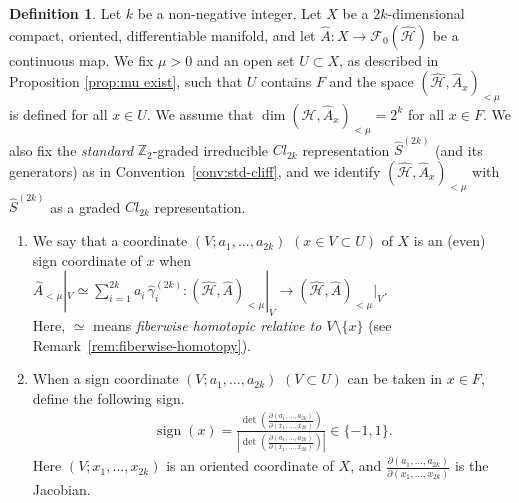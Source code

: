 \documentclass{amsart}
\theoremstyle{definition}
\newtheorem{dfn}[thm]{Definition}
\theoremstyle{remark}
\begin{document}
\begin{dfn}\label{dfn:even sign coordinates}
Let $k$ be a non-negative integer. Let $X$ be a $2k$-dimensional compact, oriented, differentiable manifold, and let $\hat{A} \colon X \to \mathcal{F}_0(\mathcal{\hat{H}})$ be a continuous map. We fix $\mu > 0$ and an open set $U \subset X$, as described in Proposition \ref{prop:mu exist}, such that $U$ contains $F$ and the space $(\mathcal{\hat{H}}, \hat{A}_x)_{<\mu}$ is defined for all $x \in U$. We assume that $\dim(\mathcal{\hat{H}}, \hat{A}_x)_{<\mu} = 2^k$ for all $x \in F$. We also fix the \emph{standard} $\mathbb{Z}_2$-graded irreducible $Cl_{2k}$ representation $\hat S^{(2k)}$ (and its generators) as in Convention~\ref{conv:std-cliff}, and we identify $(\mathcal{\hat{H}}, \hat{A}_x)_{<\mu}$ with $\hat S^{(2k)}$ as a graded $Cl_{2k}$ representation.
\begin{enumerate}
\item We say that a coordinate $(V;a_1,...,a_{2k})$ $(x\in V \subset U)$ of $X$ is an (even) sign coordinate of $x$ when $\hat{A}_{<\mu}|_V \simeq \sum_{i=1}^{2k} a_i\,\hat{\gamma}^{(2k)}_i:(\mathcal{\hat{H}}, \hat{A})_{<\mu}|_V\to (\mathcal{\hat{H}}, \hat{A})_{<\mu}|_V.$\\
Here, $\simeq$ means \emph{fiberwise homotopic relative to $V\setminus\{x\}$} (see Remark~\ref{rem:fiberwise-homotopy}).
\item When a sign coordinate $(V;a_{1},...,a_{2k})$ $(V\subset U)$ can be taken in $x \in F$, define the following sign.
\begin{align*}
\operatorname{sign}(x)=
\frac{\det\left(\frac{\partial(a_{1},\dots,a_{2k})}{\partial (x_{1},\dots,x_{2k})}\right)}
{\left|\det\left(\frac{\partial(a_{1},\dots,a_{2k})}{\partial (x_{1},\dots,x_{2k})}\right)\right|}
\in \{-1,1\}.
\end{align*}
Here $(V;x_{1},...,x_{2k})$ is an oriented coordinate of $X$, and $\frac{\partial(a_{1},...,a_{2k})}{\partial (x_{1},...,x_{2k})}$ is the Jacobian.
\end{enumerate}
\end{dfn}
\end{document}
